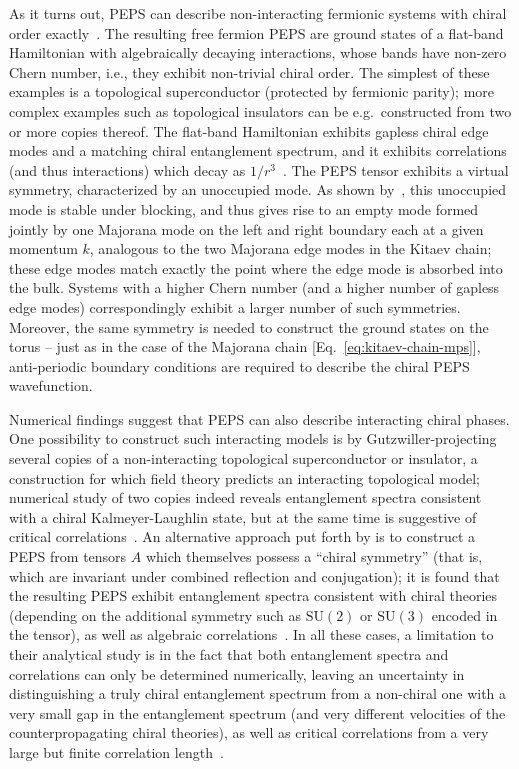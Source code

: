 \documentclass[rmp,aps,reprint,superscriptaddress,nobalancelastpage]{revtex4-1}
\begin{document}
    As it turns out, PEPS can describe non-interacting fermionic systems with chiral order exactly~\cite[][an example is given in the Appendix]{dubail:chiral-fpeps,wahl:chiral-fPEPS}.  The resulting free fermion PEPS are ground states of a flat-band Hamiltonian with algebraically decaying interactions, whose bands have non-zero Chern number, i.e., they exhibit non-trivial chiral order. The simplest of these examples is a topological superconductor (protected by fermionic parity); more complex examples such as topological insulators can be e.g.\ constructed from two or more copies thereof.
    The flat-band Hamiltonian exhibits gapless chiral edge modes and a matching chiral entanglement spectrum, and it exhibits correlations (and thus interactions) which decay as $1/r^3$~\cite{wahl:chiral-boundaries}.  The PEPS tensor exhibits a virtual symmetry, characterized by an unoccupied mode.  As shown by~\citet{wahl:chiral-boundaries}, this unoccupied mode is stable under blocking, and thus gives rise to an empty mode formed jointly by one Majorana mode on the left and right boundary each at a given momentum $k$, analogous to the two Majorana edge modes in the Kitaev chain; these edge modes match exactly the point where the edge mode is absorbed into the bulk.  Systems with a higher Chern number (and a higher number of gapless edge modes) correspondingly exhibit a larger number of such symmetries. Moreover, the same symmetry is needed to construct the ground states on the torus -- just as in the case of the Majorana chain [Eq.~\eqref{eq:kitaev-chain-mps}], anti-periodic boundary conditions are required to describe the chiral PEPS wavefunction.

    Numerical findings suggest that PEPS can also describe interacting chiral phases. One possibility to construct such interacting models is by Gutzwiller-projecting several copies of a non-interacting topological superconductor or insulator, a construction for which field theory predicts an interacting topological model; numerical study of two copies indeed reveals entanglement spectra consistent with a chiral Kalmeyer-Laughlin state, but at the same time is suggestive of critical correlations~\cite{yang:chiral-topo-fpeps}. An alternative approach put forth by \citet{poilblanc:kl-peps-1,poilblanc:kl-peps-2} is to construct a PEPS from tensors $A$ which themselves possess a ``chiral symmetry'' (that is, which are invariant under combined reflection and conjugation); it is found that the resulting PEPS exhibit entanglement spectra consistent with chiral theories (depending on the additional symmetry such as $\mathrm{SU}(2)$ or $\mathrm{SU}(3)$ encoded in the tensor), as well as algebraic correlations~\cite{poilblanc:kl-peps-1,poilblanc:kl-peps-2,hackenbroich:chiral-su2,chen:peps_su2_2_csl,chen:su3_peps_csl,haegeman:medley}.
    In all these cases, a limitation to their analytical study is in the fact that both entanglement spectra and correlations can only be determined numerically, leaving an uncertainty
    in distinguishing a truly chiral entanglement spectrum from a non-chiral one with a very small gap in the entanglement spectrum (and very different velocities of the counterpropagating chiral theories), as well as critical correlations from a very large but finite correlation length~\cite{hackenbroich:chiral-su2}.
\end{document}
